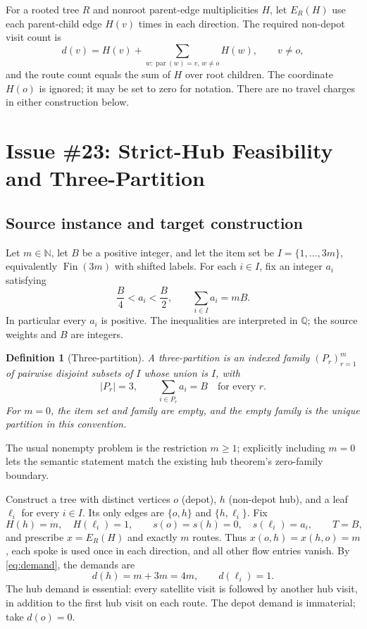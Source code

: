 \documentclass[11pt]{article}
\newtheorem{definition}[theorem]{Definition}
\theoremstyle{remark}
\newcommand{\N}{\mathbb N}
\newcommand{\Q}{\mathbb Q}
\begin{document}
For a rooted tree $R$ and nonroot parent-edge multiplicities $H$, let $E_R(H)$ use each parent-child edge $H(v)$ times in each direction.
The required non-depot visit count is
\begin{equation}\label{eq:demand}
 d(v)=H(v)+\sum_{w:\operatorname{par}(w)=v,\,w\neq o}H(w),\qquad v\neq o,
\end{equation}
and the route count equals the sum of $H$ over root children.
The coordinate $H(o)$ is ignored; it may be set to zero for notation.
There are no travel charges in either construction below.

\section{Issue \#23: Strict-Hub Feasibility and Three-Partition}

\subsection{Source instance and target construction}

Let $m\in\N$, let $B$ be a positive integer, and let the item set be
$I=\{1,\ldots,3m\}$, equivalently $\operatorname{Fin}(3m)$ with shifted labels.
For each $i\in I$, fix an integer $a_i$ satisfying
\begin{equation}\label{eq:3p-assumptions}
 \frac{B}{4}<a_i<\frac{B}{2},\qquad
 \sum_{i\in I}a_i=mB.
\end{equation}
In particular every $a_i$ is positive. The inequalities are interpreted in $\Q$; the source weights and $B$ are integers.

\begin{definition}[Three-partition]
A three-partition is an indexed family $(P_r)_{r=1}^m$ of pairwise disjoint subsets of $I$ whose union is $I$, with
\[
 |P_r|=3,\qquad \sum_{i\in P_r}a_i=B\quad\text{for every }r.
\]
For $m=0$, the item set and family are empty, and the empty family is the unique partition in this convention.
\end{definition}
The usual nonempty problem is the restriction $m\geq1$; explicitly including $m=0$ lets the semantic statement match the existing hub theorem's zero-family boundary.

Construct a tree with distinct vertices $o$ (depot), $h$ (non-depot hub), and a leaf $\ell_i$ for every $i\in I$.
Its only edges are $\{o,h\}$ and $\{h,\ell_i\}$.
Fix
\begin{equation}\label{eq:hub-input}
 H(h)=m,\quad H(\ell_i)=1,\qquad
 s(o)=s(h)=0,\quad s(\ell_i)=a_i,\qquad T=B,
\end{equation}
and prescribe $x=E_R(H)$ and exactly $m$ routes.
Thus $x(o,h)=x(h,o)=m$, each spoke is used once in each direction, and all other flow entries vanish.
By \eqref{eq:demand}, the demands are
\begin{equation}\label{eq:hub-demands}
 d(h)=m+3m=4m,\qquad d(\ell_i)=1.
\end{equation}
The hub demand is essential: every satellite visit is followed by another hub visit, in addition to the first hub visit on each route.
The depot demand is immaterial; take $d(o)=0$.
\end{document}
